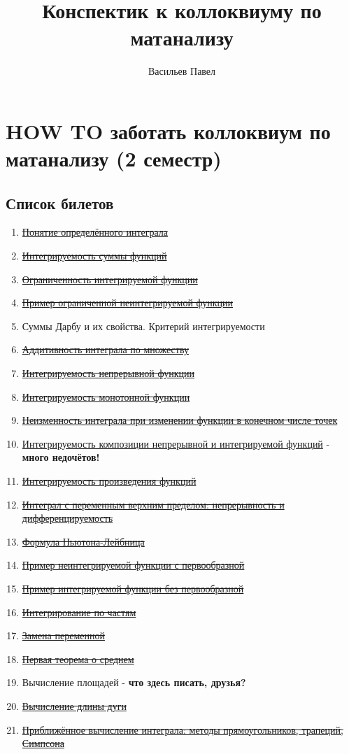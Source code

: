 \documentclass[a4paper]{article}
\title{Конспектик к коллоквиуму по матанализу}
\author{Васильев Павел}
\begin{document}
\section*{HOW TO заботать коллоквиум по матанализу (2 семестр)}


\subsection*{Список билетов}
\begin{enumerate}
\item \hyperlink{p1}{\sout{Понятие определённого интеграла}}
\item \hyperlink{p2}{\sout{Интегрируемость суммы функций}}
\item \hyperlink{p3}{\sout{Ограниченность интегрируемой функции}}
\item \hyperlink{p4}{\sout{Пример ограниченной неинтегрируемой функции}}
\item Суммы Дарбу и их свойства. Критерий интегрируемости
\item \hyperlink{p6}{\sout{Аддитивность интеграла по множеству}}
\item \hyperlink{p7}{\sout{Интегрируемость непрерывной функции}}
\item \hyperlink{p8}{\sout{Интегрируемость монотонной функции}}
\item \hyperlink{p9}{\sout{Неизменность интеграла при изменении функции в конечном числе точек}}
\item \hyperlink{p10}{Интегрируемость композиции непрерывной и интегрируемой функций} - \textbf{много недочётов!}
\item \hyperlink{p11}{\sout{Интегрируемость произведения функций}}
\item \hyperlink{p12}{\sout{Интеграл с переменным верхним пределом: непрерывность и дифференцируемость}}
\item \hyperlink{p13}{\sout{Формула Ньютона-Лейбница}}
\item \hyperlink{p14}{\sout{Пример неинтегрируемой функции с первообразной}}
\item \hyperlink{p15}{\sout{Пример интегрируемой функции без первообразной}}
\item \hyperlink{p16}{\sout{Интегрирование по частям}}
\item \hyperlink{p17}{\sout{Замена переменной}}
\item \hyperlink{p18}{\sout{Первая теорема о среднем}}
\item Вычисление площадей - \textbf{что здесь писать, друзья?}
\item \hyperlink{p20}{\sout{Вычисление длины дуги}}
\item\hyperlink{p21}{\sout{Приближённое вычисление интеграла: методы прямоугольников, трапеций, Симпсона}}
\end{enumerate}
\end{document}
